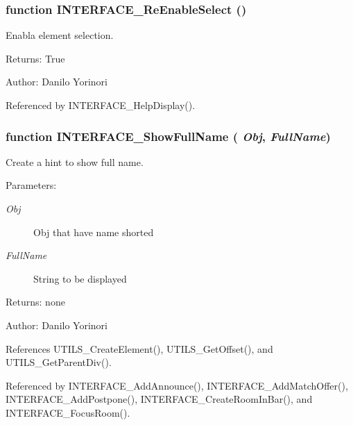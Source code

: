 \subsubsection[INTERFACE\_\-ReEnableSelect]{\setlength{\rightskip}{0pt plus 5cm}function INTERFACE\_\-ReEnableSelect ()}\label{interface_8js_276d3ccc18b080387ece750f3cdcec03}


Enabla element selection. 

\begin{Desc}
\item[Returns:]True \end{Desc}
\begin{Desc}
\item[Author:]Danilo Yorinori \end{Desc}


Referenced by INTERFACE\_\-HelpDisplay().
\subsubsection[INTERFACE\_\-ShowFullName]{\setlength{\rightskip}{0pt plus 5cm}function INTERFACE\_\-ShowFullName ( {\em Obj}, \/   {\em FullName})}\label{interface_8js_bcb5b20122bebb3a18b2ede66110d954}


Create a hint to show full name. 

\begin{Desc}
\item[Parameters:]
\begin{description}
\item[{\em Obj}]Obj that have name shorted \item[{\em FullName}]String to be displayed \end{description}
\end{Desc}
\begin{Desc}
\item[Returns:]none \end{Desc}
\begin{Desc}
\item[Author:]Danilo Yorinori \end{Desc}


References UTILS\_\-CreateElement(), UTILS\_\-GetOffset(), and UTILS\_\-GetParentDiv().

Referenced by INTERFACE\_\-AddAnnounce(), INTERFACE\_\-AddMatchOffer(), INTERFACE\_\-AddPostpone(), INTERFACE\_\-CreateRoomInBar(), and INTERFACE\_\-FocusRoom().
